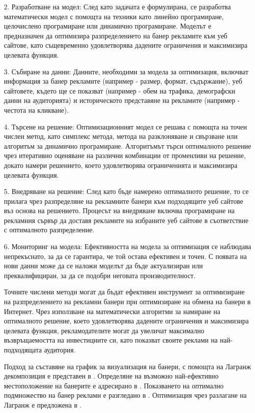 2. Разработване на модел: След като задачата е формулирана, се разработва математически модел с помощта на техники като линейно програмиране, целочислено програмиране или динамично програмиране. Моделът е предназначен да оптимизира разпределението на банер рекламите към уеб сайтове, като същевременно удовлетворява дадените ограничения и максимизира целевата функция.

3. Събиране на данни: Данните, необходими за модела за оптимизация, включват информация за банер рекламите (например - размер, формат, съдържание), уеб сайтовете, където ще се показват (например - обем на трафика, демографски данни на аудиторията) и историческото представяне на рекламите (например - честота на кликване).

4. Търсене на решение: Оптимизационният модел се решава с помощта на точен числен метод, като симплекс метода, метода на разклоняване и свързване или алгоритъм за динамично програмиране. Алгоритъмът търси оптималното решение чрез итеративно оценяване на различни комбинации от променливи на решение, докато намери решението, което удовлетворява ограниченията и максимизира целевата функция.

5. Внедряване на решение: След като бъде намерено оптималното решение, то се прилага чрез разпределяне на рекламните банери към подходящите уеб сайтове въз основа на решението. Процесът на внедряване включва програмиране на рекламния сървър да доставя рекламите на избраните уеб сайтове в съответствие с оптималното разпределение.

6. Мониторинг на модела: Ефективността на модела за оптимизация се наблюдава непрекъснато, за да се гарантира, че той остава ефективен и точен. С появата на нови данни може да се наложи моделът да бъде актуализиран или преквалифициран, за да се подобри неговата производителност.

Точните числени методи могат да бъдат ефективен инструмент за оптимизиране на разпределението на рекламни банери при оптимизиране на обмена на банери в Интернет. Чрез използване на математически алгоритми за намиране на оптималното решение, което удовлетворява дадените ограничения и максимизира целевата функция, рекламодателите могат да увеличат максимално възвръщаемостта на инвестициите си, като показват своите реклами на най-подходящата аудитория.

Подход за съставяне на график за визуализация на банери, с помощта на Лагранж декомпозиция е представен в \cite{10.1145/945846.945848}. Определяне на възможно най-ефективно местоположение на банерите е адресирано в \cite{Kaul2018}. Показването на оптимално подмножество на банер реклами е разгледано в \cite{https://doi.org/10.1002/jos.74}. Оптимизация чрез разлагане на Лагранж е предложена в \cite{doi:10.1287/ijoc.1020.0003}.

